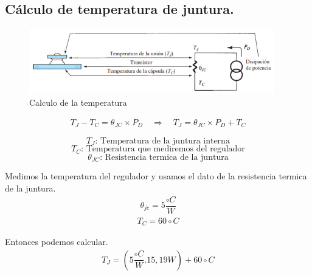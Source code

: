 \subsection{Cálculo de temperatura de juntura.}

\begin{figure}[H]
  \centering
  \includegraphics[width=0.95\textwidth]{images/calculoTemperatura.png}
  \caption{Calculo de la temperatura}
\end{figure}

\begin{equation}
  \begin{aligned}
    T_J - T_C = \theta_{JC} \times P_D \quad \Rightarrow \quad T_J = \theta_{JC} \times P_D + T_C
   \end{aligned}
\end{equation}

\[
  T_J \text{: Temperatura de la juntura interna}
\]
\[
  T_C \text{: Temperatura que mediremos del regulador}
\]
\[
  \theta_{JC} \text{: Resistencia termica de la juntura}
\]

Medimos la temperatura del regulador y usamos el dato de la resistencia termica de la juntura. \\

\begin{equation}
  \begin{aligned}
    \theta_{jc} = 5\dfrac{\circ C}{W}
  \end{aligned}
\end{equation}
\begin{equation}
  \begin{aligned}
    T_C = 60 \circ C
  \end{aligned}
\end{equation}

Entonces podemos calcular. \\

\begin{equation}
  \begin{aligned}
    T_J = (5\dfrac{\circ C}{W} . 15,19 W) + 60 \circ C
  \end{aligned}
\end{equation}


